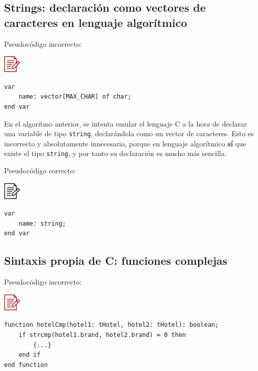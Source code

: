 \documentclass[
]{book}
\begin{document}
\hypertarget{strings-declaraciuxf3n-como-vectores-de-caracteres-en-lenguaje-algoruxedtmico}{%
\subsection{Strings: declaración como vectores de caracteres en lenguaje algorítmico}\label{strings-declaraciuxf3n-como-vectores-de-caracteres-en-lenguaje-algoruxedtmico}}

Pseudocódigo incorrecto:

\includegraphics{./img/alg_err.png}

\begin{verbatim}
var
    name: vector[MAX_CHAR] of char;
end var
\end{verbatim}

En el algoritmo anterior, se intenta emular el lenguaje C a la hora de declarar una variable de tipo \texttt{string}, declarándola como un vector de caracteres. Esto es incorrecto y absolutamente innecesario, porque en lenguaje algorítmico \textbf{sí} que existe el tipo \texttt{string}, y por tanto su declaración es mucho más sencilla.

Pseudocódigo correcto:

\includegraphics{./img/alg.png}

\begin{verbatim}
var
    name: string;
end var
\end{verbatim}

\hypertarget{sintaxis-propia-de-c-funciones-complejas}{%
\subsection{Sintaxis propia de C: funciones complejas}\label{sintaxis-propia-de-c-funciones-complejas}}

Pseudocódigo incorrecto:

\includegraphics{./img/alg_err.png}

\begin{verbatim}
function hotelCmp(hotel1: tHotel, hotel2: tHotel): boolean;
    if strcmp(hotel1.brand, hotel2.brand) = 0 then
        {...}
    end if
end function
\end{verbatim}
\end{document}
